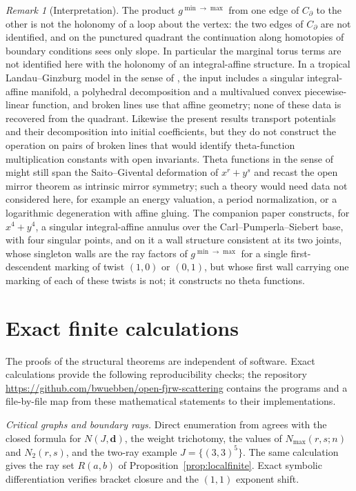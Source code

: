 \documentclass[11pt]{amsart}
\theoremstyle{definition}
\theoremstyle{remark}
\newtheorem{remark}[theorem]{Remark}
\begin{document}
\begin{remark}[Interpretation]
\label{rem:interpretation}
The product $g^{\min\to\max}$ from one edge of $C_\partial$ to the other is
not the holonomy of a loop about the vertex: the two edges of $C_\partial$ are
not identified, and on the punctured quadrant the continuation along
homotopies of
boundary conditions sees only slope.  In particular the marginal torus terms
are not identified here with the holonomy of an integral-affine structure.  In
a tropical Landau--Ginzburg model in the sense of \cite{CPS}, the input
includes a singular integral-affine manifold, a polyhedral decomposition and
a multivalued convex piecewise-linear function, and broken lines use that
affine geometry; none of these data is recovered from the quadrant.  Likewise
the present results transport potentials and their decomposition into initial
coefficients, but
they do not construct the operation on pairs of broken lines that would
identify theta-function multiplication constants with open invariants.  Theta
functions in the sense of \cite{GHK15,GHKK,GS-intrinsic} might still span the
Saito--Givental deformation of $x^r+y^s$ and recast the open mirror theorem
\cite[Thm.~0.3]{GKT} as intrinsic mirror symmetry; such a theory would need
data not considered here, for example an energy valuation, a period
normalization, or a logarithmic degeneration with affine gluing.  The
companion paper \cite{annular} constructs, for $x^4+y^4$, a singular
integral-affine annulus over the Carl--Pumperla--Siebert base, with four
singular points, and on it a wall structure consistent at its two joints,
whose singleton walls are the ray factors of $g^{\min\to\max}$ for a single first-descendent marking of twist $(1,0)$ or $(0,1)$, but whose first wall carrying one marking of each of these twists is not; it constructs no theta functions.
\end{remark}

\section{Exact finite calculations}
\label{sec:cert}

The proofs of the structural theorems are independent of software.  Exact
calculations provide the following reproducibility checks; the repository
\url{https://github.com/bwuebben/open-fjrw-scattering} contains the programs
and a file-by-file map from these mathematical statements to their
implementations.

\emph{Critical graphs and boundary rays.}
Direct enumeration from \cite[Not.~2.40]{GKT} agrees with the closed formula
for $N(J,\mathbf d)$, the weight trichotomy, the values of
$N_{\max}(r,s;n)$ and $N_2(r,s)$, and the two-ray example
$J=\{(3,3)^5\}$.  The same calculation gives the ray set
$R(a,b)$ of Proposition~\ref{prop:localfinite}.  Exact symbolic
differentiation verifies bracket closure and the $(1,1)$ exponent shift.
\end{document}
